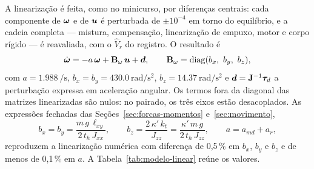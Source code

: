 A linearização é feita, como no minicurso, por diferenças centrais: cada
componente de $\bm{\omega}$ e de $\bm{u}$ é perturbada de $\pm 10^{-4}$
em torno do equilíbrio, e a cadeia completa --- mistura, compensação,
linearização de empuxo, motor e corpo rígido --- é reavaliada, com o
$\hat V_r$ do registro. O resultado é
\begin{equation}
\dot{\bm{\omega}} = -a\,\bm{\omega} + \mathbf{B}_\omega\,\bm{u} + \bm{d},
\qquad
\mathbf{B}_\omega = \operatorname{diag}(b_x,\ b_y,\ b_z),
\label{eq:modelo-taxa}
\end{equation}
com $a = \SI{1.988}{\per\second}$, $b_x = b_y = \SI{430.0}{\radian\per\second\squared}$,
$b_z = \SI{14.37}{\radian\per\second\squared}$ e
$\bm{d} = \mathbf{J}^{-1}\bm{\tau}_d$ a perturbação expressa em
aceleração angular. Os termos fora da diagonal das matrizes linearizadas são
nulos: no pairado, os três eixos estão desacoplados. As expressões fechadas
das Seções~\ref{sec:forcas-momentos} e~\ref{sec:movimento},
\begin{equation}
b_x = b_y = \frac{m\,g\,\ell_{xy}}{2\,t_h\,J_{xx}}, \qquad
b_z = \frac{2\,\kappa'\,k_t}{J_{zz}} = \frac{\kappa'\,m\,g}{2\,t_h\,J_{zz}}, \qquad
a = a_{md} + a_r,
\label{eq:coeficientes-fechados}
\end{equation}
reproduzem a linearização numérica com diferença de 0,5\,\% em $b_x$, $b_y$
e $b_z$ e de menos de 0,1\,\% em $a$. A
Tabela~\ref{tab:modelo-linear} reúne os valores.

